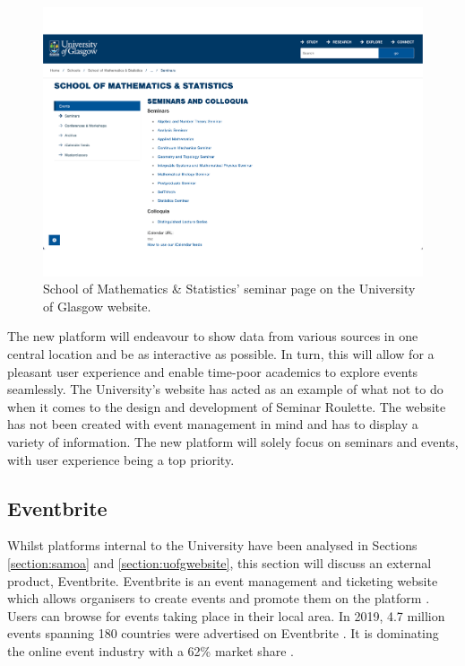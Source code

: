 \documentclass{l4proj}
\begin{document}
\begin{figure}[htb]
    \centering
    \includegraphics[width=0.8\linewidth]{images/uofg_website.pdf}    
    \caption{School of Mathematics \& Statistics' seminar page on the University of Glasgow website.}
    \label{fig:uofgwebsite} 
\end{figure}

The new platform will endeavour to show data from various sources in one central location and be as interactive as possible. In turn, this will allow for a pleasant user experience and enable time-poor academics to explore events seamlessly. The University's website has acted as an example of what not to do when it comes to the design and development of Seminar Roulette. The website has not been created with event management in mind and has to display a variety of information. The new platform will solely focus on seminars and events, with user experience being a top priority.

\subsection{Eventbrite}
\label{section:eventbrite}

Whilst platforms internal to the University have been analysed in Sections \ref{section:samoa} and \ref{section:uofgwebsite}, this section will discuss an external product, Eventbrite. Eventbrite is an event management and ticketing website which allows organisers to create events and promote them on the platform \citep{eventbrite}. Users can browse for events taking place in their local area. In 2019, 4.7 million events spanning 180 countries were advertised on Eventbrite \citep{eventbritestats}. It is dominating the online event industry with a 62\% market share \citep{eventbritemarketshare}.
\end{document}
